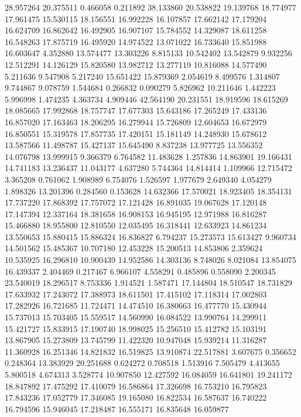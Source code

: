 28.957264
20.375511
0.466058
0.211892
38.133860
20.538822
19.139768
18.774977
17.961475
15.530115
18.156551
16.992228
16.107857
17.662142
17.179204
16.624709
16.862642
16.492905
16.907107
15.784552
14.329087
18.611258
16.548263
17.875719
16.495920
14.974522
13.071022
16.733640
15.851988
16.603647
4.352880
13.574477
13.303226
8.815133
10.542402
13.542879
9.932256
12.512291
14.126129
15.820580
13.982712
13.277119
10.816088
14.577490
5.211636
9.547908
5.217240
15.651422
15.879369
2.054619
8.499576
1.314807
9.744867
9.078759
1.544684
0.266832
0.090279
5.826962
10.211646
1.442223
5.996998
1.474235
4.363734
4.909446
42.564190
20.231551
18.919596
18.615269
18.085665
17.992868
18.757747
17.677303
15.643186
17.265249
17.433136
16.857020
17.163463
18.206295
16.279944
15.726809
12.604653
16.672979
16.850551
15.319578
17.857735
17.420151
15.181149
14.248930
15.678612
13.587566
11.498787
15.427137
15.645490
8.837238
13.977725
13.556352
14.076798
13.999915
9.366379
6.764582
11.483628
1.257836
14.863901
19.166431
14.741183
13.236437
11.043177
4.637280
5.744364
14.814414
1.109966
12.715472
3.365208
0.761062
1.908989
6.754076
1.526597
1.977679
2.649340
4.054279
1.898326
13.201396
0.284560
0.153628
14.632366
17.570021
18.923405
18.354131
17.737220
17.868392
17.757072
17.121428
16.891035
19.067628
17.120148
17.147394
12.337164
18.381658
16.908153
16.945195
12.971988
16.816287
15.466880
18.955800
12.810550
12.035495
16.318441
12.633923
14.861234
13.550653
15.880415
15.886324
16.836827
6.794237
15.273573
15.613427
9.960734
14.501562
15.485367
10.707180
12.453228
15.200513
14.853806
2.359624
10.535925
16.296810
10.900439
14.952586
14.303136
8.748026
8.021084
13.854075
16.439337
2.404469
0.217467
6.966107
4.558291
0.485896
0.558090
2.200345
23.540019
18.296517
8.753336
1.914521
1.587471
17.144804
18.510547
18.731829
17.633932
17.243072
17.388973
18.611501
17.415102
17.118314
17.002803
17.282926
16.721685
11.724471
14.474510
16.380663
16.477770
15.430944
15.737013
15.703405
15.559517
14.560990
16.084522
13.990764
14.299911
15.421727
15.833915
17.190740
18.998025
15.256510
15.412782
15.103191
13.867905
15.273809
13.745799
11.422320
10.947048
15.939214
11.316287
11.360928
16.251346
14.821832
16.519825
13.910874
22.517881
3.607675
0.356652
0.248364
13.383929
20.251688
0.624272
0.708518
1.513916
7.505479
4.413655
5.800518
4.674313
3.528774
10.907850
12.427592
16.084059
16.641801
19.241172
18.847892
17.475292
17.410079
16.586864
17.326698
16.753210
16.795823
17.843236
17.052779
17.346085
19.165080
16.822534
16.587637
16.740222
16.794596
15.946045
17.218487
16.555171
16.835648
16.059877
